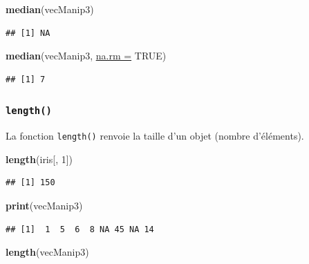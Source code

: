 \documentclass[twoside,symmetric]{book}
\newenvironment{Shaded}{}{}
\newcommand{\DataTypeTok}[1]{\underline{#1}}
\newcommand{\DecValTok}[1]{#1}
\newcommand{\KeywordTok}[1]{\textbf{#1}}
\newcommand{\NormalTok}[1]{#1}
\newcommand{\OtherTok}[1]{#1}
\begin{document}
\begin{Shaded}
\begin{Highlighting}[]
\KeywordTok{median}\NormalTok{(vecManip3)}
\end{Highlighting}
\end{Shaded}

\begin{verbatim}
## [1] NA
\end{verbatim}

\begin{Shaded}
\begin{Highlighting}[]
\KeywordTok{median}\NormalTok{(vecManip3, }\DataTypeTok{na.rm =} \OtherTok{TRUE}\NormalTok{)}
\end{Highlighting}
\end{Shaded}

\begin{verbatim}
## [1] 7
\end{verbatim}

\hypertarget{l015length}{%
\subsubsection{\texorpdfstring{\texttt{length()}}{length()}}\label{l015length}}

La fonction \texttt{length()} renvoie la taille d'un objet (nombre d'éléments).

\begin{Shaded}
\begin{Highlighting}[]
\KeywordTok{length}\NormalTok{(iris[, }\DecValTok{1}\NormalTok{])}
\end{Highlighting}
\end{Shaded}

\begin{verbatim}
## [1] 150
\end{verbatim}

\begin{Shaded}
\begin{Highlighting}[]
\KeywordTok{print}\NormalTok{(vecManip3)}
\end{Highlighting}
\end{Shaded}

\begin{verbatim}
## [1]  1  5  6  8 NA 45 NA 14
\end{verbatim}

\begin{Shaded}
\begin{Highlighting}[]
\KeywordTok{length}\NormalTok{(vecManip3)}
\end{Highlighting}
\end{Shaded}
\end{document}
